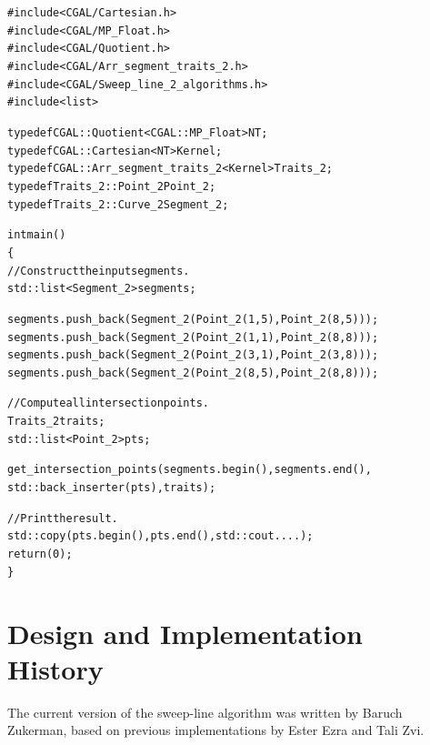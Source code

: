 \begin{alltt}
#include <CGAL/Cartesian.h>
#include <CGAL/MP_Float.h>
#include <CGAL/Quotient.h>
#include <CGAL/Arr_segment_traits_2.h>
#include <CGAL/Sweep_line_2_algorithms.h>
#include <list>

typedef CGAL::Quotient<CGAL::MP_Float>                  NT;
typedef CGAL::Cartesian<NT>                             Kernel;
typedef CGAL::Arr_segment_traits_2<Kernel>              Traits_2;
typedef Traits_2::Point_2                               Point_2;
typedef Traits_2::Curve_2                               Segment_2;

int main()
\{
  // Construct the input segments.
  std::list<Segment_2>   segments;
  
  segments.push_back (Segment_2 (Point_2 (1, 5), Point_2 (8, 5)));
  segments.push_back (Segment_2 (Point_2 (1, 1), Point_2 (8, 8)));
  segments.push_back (Segment_2 (Point_2 (3, 1), Point_2 (3, 8)));
  segments.push_back (Segment_2 (Point_2 (8, 5), Point_2 (8, 8)));

  // Compute all intersection points.
  Traits_2               traits;
  std::list<Point_2>     pts;

  get_intersection_points (segments.begin(), segments.end(),
                           std::back_inserter (pts), traits);
  
  // Print the result.
  std::copy (pts.begin(), pts.end(), std::cout ....);
  return (0);
\}
\end{alltt}

\section*{Design and Implementation History}
%
The current version of the sweep-line algorithm was written by
Baruch Zukerman, based on previous implementations by Ester Ezra and
Tali Zvi.

